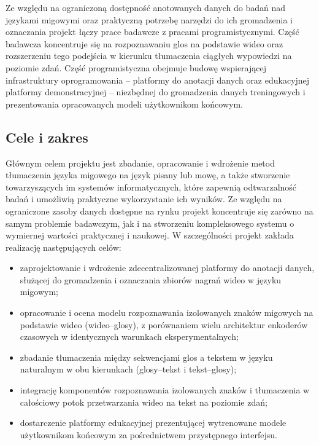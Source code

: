 Ze względu na ograniczoną dostępność anotowanych danych do badań nad językami
migowymi oraz praktyczną potrzebę narzędzi do ich gromadzenia i oznaczania projekt
łączy prace badawcze z pracami programistycznymi. Część badawcza koncentruje się
na rozpoznawaniu glos na podstawie wideo oraz rozszerzeniu tego podejścia
w kierunku tłumaczenia ciągłych wypowiedzi na poziomie zdań. Część programistyczna
obejmuje budowę wspierającej infrastruktury oprogramowania -- platformy do
anotacji danych oraz edukacyjnej platformy demonstracyjnej -- niezbędnej do
gromadzenia danych treningowych i prezentowania opracowanych modeli użytkownikom
końcowym.

\subsection{Cele i zakres}
\label{sec:goals-scope}

Głównym celem projektu jest zbadanie, opracowanie i wdrożenie metod tłumaczenia
języka migowego na język pisany lub mowę, a także stworzenie towarzyszących im
systemów informatycznych, które zapewnią odtwarzalność badań i umożliwią
praktyczne wykorzystanie ich wyników. Ze względu na ograniczone zasoby danych
dostępne na rynku projekt koncentruje się zarówno na samym problemie badawczym,
jak i na stworzeniu kompleksowego systemu o wymiernej wartości praktycznej
i naukowej. W szczególności projekt zakłada realizację następujących celów:

\begin{itemize}
  \item zaprojektowanie i wdrożenie zdecentralizowanej platformy do anotacji
        danych, służącej do gromadzenia i oznaczania zbiorów nagrań wideo
        w języku migowym;
  \item opracowanie i ocena modelu rozpoznawania izolowanych znaków migowych
        na podstawie wideo (wideo--glosy), z porównaniem wielu architektur
        enkoderów czasowych w identycznych warunkach eksperymentalnych;
  \item zbadanie tłumaczenia między sekwencjami glos a tekstem w języku
        naturalnym w obu kierunkach (glosy--tekst i tekst--glosy);
  \item integrację komponentów rozpoznawania izolowanych znaków i tłumaczenia
        w całościowy potok przetwarzania wideo na tekst na poziomie zdań;
  \item dostarczenie platformy edukacyjnej prezentującej wytrenowane modele
        użytkownikom końcowym za pośrednictwem przystępnego interfejsu.
\end{itemize}

